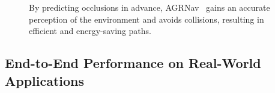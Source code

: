 \begin{figure}[!t]
    
    \centering

    
    \caption{By predicting occlusions in advance, AGRNav~\cite{agrnav} gains an accurate perception of the environment and avoids collisions, resulting in efficient and energy-saving paths.}
    \label{fig:agrnav}
\end{figure}


\subsection{End-to-End Performance on Real-World Applications}

